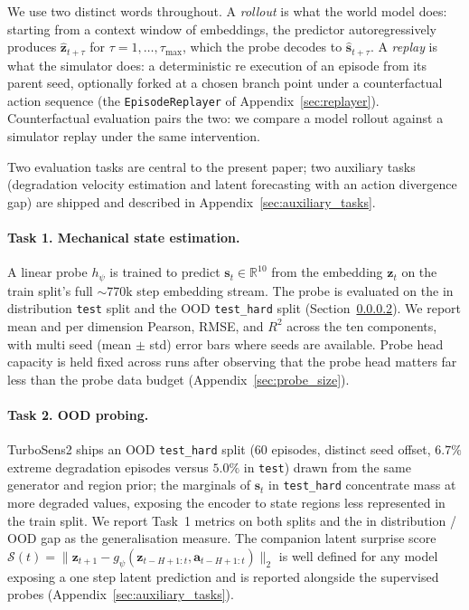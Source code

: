 \documentclass{article}
\begin{document}
We use two distinct words throughout. A \emph{rollout} is what the world model does: starting from a context window of embeddings, the predictor autoregressively produces $\hat{\mathbf{z}}_{t+\tau}$ for $\tau = 1, \ldots, \tau_\mathrm{max}$, which the probe decodes to $\hat{\mathbf{s}}_{t+\tau}$. A \emph{replay} is what the simulator does: a deterministic re execution of an episode from its parent seed, optionally forked at a chosen branch point under a counterfactual action sequence (the \texttt{EpisodeReplayer} of
Appendix~\ref{sec:replayer}). Counterfactual evaluation pairs the two: we compare a model rollout against a simulator replay under the same intervention.

Two evaluation tasks are central to the present paper; two auxiliary tasks (degradation velocity estimation and latent forecasting with an action divergence gap) are shipped and described in Appendix~\ref{sec:auxiliary_tasks}.

\paragraph{Task 1. Mechanical state estimation.}
A linear probe $h_\psi$ is trained to predict
$\mathbf{s}_t \in \mathbb{R}^{10}$ from the embedding $\mathbf{z}_t$
on the train split's full $\sim$770k step embedding stream. The probe
is evaluated on the in distribution \texttt{test} split and the OOD
\texttt{test\_hard} split (Section~\ref{sec:ood}). We report mean and
per dimension Pearson, RMSE, and $R^2$ across the ten components, with
multi seed (mean $\pm$ std) error bars where seeds are available.
Probe head capacity is held fixed across runs after observing that the
probe head matters far less than the probe data budget
(Appendix~\ref{sec:probe_size}).

\paragraph{Task 2. OOD probing.}
\label{sec:ood}
TurboSens2 ships an OOD \texttt{test\_hard} split (60 episodes,
distinct seed offset, $6.7\%$ extreme degradation episodes versus
$5.0\%$ in \texttt{test}) drawn from the same generator and region
prior; the marginals of $\mathbf{s}_t$ in \texttt{test\_hard}
concentrate mass at more degraded values, exposing the encoder to
state regions less represented in the train split. We report Task~1
metrics on both splits and the in distribution / OOD gap as the
generalisation measure. The companion latent surprise score
$\mathcal{S}(t) = \|\mathbf{z}_{t+1} - g_\psi(\mathbf{z}_{t-H+1:t},
\mathbf{a}_{t-H+1:t})\|_2$ is well defined for any model exposing a
one step latent prediction and is reported alongside the supervised
probes (Appendix~\ref{sec:auxiliary_tasks}).
\end{document}
